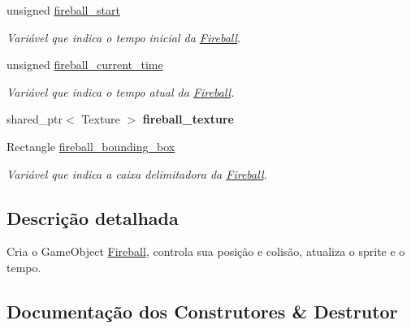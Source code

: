 \begin{DoxyCompactItemize}
unsigned \mbox{\hyperlink{classFireball_a4d1ebf057ecd8623b13b990b0176d322}{fireball\+\_\+start}}
\begin{DoxyCompactList}\small\item\em Variável que indica o tempo inicial da \mbox{\hyperlink{classFireball}{Fireball}}. \end{DoxyCompactList}\item 
\mbox{\label{classFireball_a9c1277eb7ce60712afe86ac37ad5371c}} 
unsigned \mbox{\hyperlink{classFireball_a9c1277eb7ce60712afe86ac37ad5371c}{fireball\+\_\+current\+\_\+time}}
\begin{DoxyCompactList}\small\item\em Variável que indica o tempo atual da \mbox{\hyperlink{classFireball}{Fireball}}. \end{DoxyCompactList}\item 
\mbox{\label{classFireball_a1b970a7da9435c5b43b431a89b3c8592}} 
shared\+\_\+ptr$<$ Texture $>$ {\bfseries fireball\+\_\+texture}
\item 
\mbox{\label{classFireball_ad2f50d05e164069864ed50ad5d044b87}} 
Rectangle \mbox{\hyperlink{classFireball_ad2f50d05e164069864ed50ad5d044b87}{fireball\+\_\+bounding\+\_\+box}}
\begin{DoxyCompactList}\small\item\em Variável que indica a caixa delimitadora da \mbox{\hyperlink{classFireball}{Fireball}}. \end{DoxyCompactList}\end{DoxyCompactItemize}


\subsection{Descrição detalhada}
Cria o Game\+Object \mbox{\hyperlink{classFireball}{Fireball}}, controla sua posição e colisão, atualiza o sprite e o tempo. 

\subsection{Documentação dos Construtores \& Destrutor}
\mbox{\label{classFireball_a4035f700f882afc6e0760b4195e90ffc}} 
